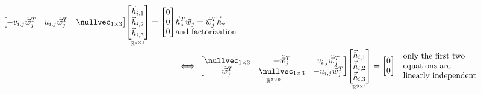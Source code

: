 \begin{description}
\begin{description}
\begin{align*}
{\begin{bmatrix}
                            -v_{i,j} \tilde{\vec{w}}_j^T & u_{i,j} \tilde{\vec{w}}_j^T & \nullvec_{1\times 3}
                        \end{bmatrix}}
                        \underset{\mathbb{R}^{9 \times 1}}{\begin{bmatrix}
                            \vec{h}_{i,1} \\ \vec{h}_{i,2} \\ \vec{h}_{i,3}
                        \end{bmatrix}}
                        =
                        \begin{bmatrix} 0 \\ 0 \\ 0 \end{bmatrix} 
                    & \text{\parbox[t]{5cm}{$\vec{h}_{*}^T \tilde{\vec{w}}_j = \tilde{\vec{w}}_j^T \vec{h}_{*}$\\and factorization}} \\
                    &\iff
                        \underset{\mathbb{R}^{2 \times 9}}{\begin{bmatrix}
                            \nullvec_{1 \times 3} & -\tilde{\vec{w}}_j^T & v_{i,j} \tilde{\vec{w}}_j^T \\
                            \tilde{\vec{w}}_j^T & \nullvec_{1\times 3} & -u_{i,j} \tilde{\vec{w}}_j^T \\
                        \end{bmatrix}}
                        \underset{\mathbb{R}^{9 \times 1}}{\begin{bmatrix}
                            \vec{h}_{i,1} \\ \vec{h}_{i,2} \\ \vec{h}_{i,3}
                        \end{bmatrix}}
                        =
                        \begin{bmatrix} 0 \\ 0 \end{bmatrix} 
                    & \text{\parbox{5cm}{only the first two\\equations are\\linearly independent}} \\
                \end{align*}
        \end{description}


\end{description}
